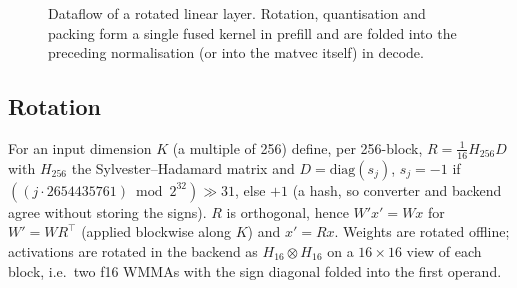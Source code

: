 \documentclass[10.5pt,a4paper]{article}
\begin{document}
\begin{figure}[H]
\centering
{}
\caption{Dataflow of a rotated linear layer. Rotation, quantisation and packing form a single fused kernel in prefill and are folded into the preceding normalisation (or into the matvec itself) in decode.}
\end{figure}

\subsection{Rotation}
For an input dimension $K$ (a multiple of 256) define, per 256-block, $R=\tfrac1{16}H_{256}D$ with $H_{256}$ the Sylvester--Hadamard matrix and $D=\mathrm{diag}(s_j)$,
$s_j=-1$ if $((j\cdot2654435761)\bmod2^{32})\gg31$, else $+1$ (a hash, so converter and backend agree without storing the signs). $R$ is orthogonal, hence $W'x'=Wx$ for
$W'=WR^{\top}$ (applied blockwise along $K$) and $x'=Rx$. Weights are rotated offline; activations are rotated in the backend as $H_{16}\otimes H_{16}$ on a $16\times16$ view of each block,
i.e.\ two f16 WMMAs with the sign diagonal folded into the first operand.
\end{document}
